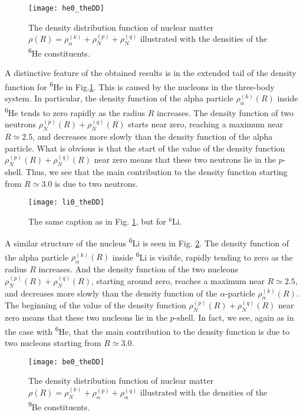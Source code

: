 \documentclass[
12pt, %
oneside, %
english, %
onehalfspacing, %
onehalfspacing, %
headsepline, %
]{MastersDoctoralThesis} %
\newcommand{\he}{\textsuperscript{6}He\xspace}
\newcommand{\li}{\textsuperscript{6}Li\xspace}
\newcommand{\be}{\textsuperscript{9}Be\xspace}
\begin{document}
\begin{figure}[bp]
\centering
\texttt{[image: he0\_theDD]}
\decoRule
\caption{  \footnotesize  The density distribution function of nuclear matter $\rho(R)=\rho_{\alpha}^{(k)}+\rho_{N}^{(p)}+\rho_{N}^{(q)}$  illustrated with the densities of the \he constituents. }
\label{he0_theDD}
\end{figure}


A distinctive feature of the obtained results is in the extended tail of the density function for \he in Fig.\ref{he0_theDD}. This is caused by the nucleons in the three-body system. In particular, the density function of the alpha particle $\rho_\alpha^{(k)}(R)$ inside \he tends to zero rapidly as the radius $R$ increases. The density function of two neutrons $\rho_N^{(p)}(R)+\rho_N^{(q)}(R)$ starts near zero, reaching a maximum near $R \simeq 2.5$, and decreases more slowly than the density function of the alpha particle. What is obvious is that the start of the value of the  density function $\rho_N^{(p)}(R)+\rho_N^{(q)}(R)$ near zero means that these two neutrons lie in the $p$-shell. Thus, we see that the main contribution to the density function starting from $R \simeq 3.0$ is due to two neutrons.


\begin{figure}[tp]
\centering
\texttt{[image: li0\_theDD]}
\decoRule
\caption{  \footnotesize  The same caption as in Fig. \ref{he0_theDD}, but for $^6$Li. }
\label{li0_theDD}
\end{figure}

A similar structure of the  nucleus \li is seen in Fig. \ref{li0_theDD}. The density function of the alpha particle $\rho_\alpha^{(k)}(R)$ inside \li is visible, rapidly tending to zero as the radius $R$ increases. And the density function of the two nucleons $\rho_N^{(p)}(R)+\rho_N^{(q)}(R)$, starting around zero, reaches a maximum near $R\simeq 2.5$, and decreases more slowly than the density function of the $\alpha$-particle $\rho_\alpha^{(k)}(R)$.
  The beginning of the value of the density function $\rho_N^{(p)}(R)+\rho_N^{(q)}(R)$ near zero means that these two nucleons lie in the $p$-shell. In fact, we see, again as in the case with \he, that the main contribution to the density function is due to two nucleons starting from $R \simeq 3.0$.

\begin{figure}[bp]
\centering
\texttt{[image: be0\_theDD]}
\decoRule
\caption{  \footnotesize  The density distribution function of nuclear matter $\rho(R)=\rho_{N}^{(k)}+\rho_{\alpha}^{(p)}+\rho_{\alpha}^{(q)}$  illustrated with the densities of the \be constituents. }
\label{be0_theDD}
\end{figure}
\end{document}
